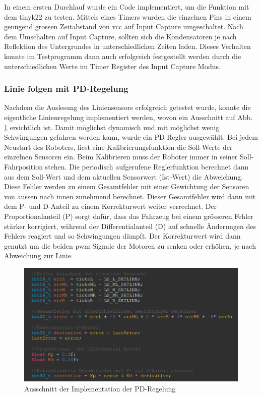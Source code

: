 In einem ersten Durchlauf wurde ein Code implementiert, um die Funktion mit dem \gls{tinyk22} zu testen. Mittels eines Timers wurden die einzelnen Pins in einem genügend grossen Zeitabstand von \acrfull{vcc} auf Input Capture umgeschaltet. Nach dem Umschalten auf Input Capture, sollten sich die Kondensatoren je nach Reflektion des Untergrundes in unterschiedlichen Zeiten laden. Dieses Verhalten konnte im Testprogramm dann auch erfolgreich festgestellt werden durch die unterschiedlichen Werte im Timer Register des Input Capture Modus.


\subsubsection{Linie folgen mit PD-Regelung}
\label{Linie folgen mit PD-Regelung}

Nachdem die Auslesung des Liniensensors erfolgreich getestet wurde, konnte die eigentliche Linienregelung implementiert werden, wovon ein Ausschnitt auf Abb. \ref{fig:Ausschnitt der Implementation der PD-Regelung} ersichtlich ist. Damit möglichst dynamisch und mit möglichst wenig Schwingungen gefahren werden kann, wurde ein PD-Regler ausgewählt. Bei jedem Neustart des Roboters, liest eine Kalibrierungsfunktion die Soll-Werte der einzelnen Sensoren ein. Beim Kalibrieren muss der Roboter immer in seiner Soll-Fahrposition stehen. Die periodisch aufgerufene Reglerfunktion berechnet dann aus dem Soll-Wert und dem aktuellen Sensorwert (Ist-Wert) die Abweichung. Diese Fehler werden zu einem Gesamtfehler mit einer Gewichtung der Sensoren von aussen nach innen zunehmend berechnet. Dieser Gesamtfehler wird dann mit dem P- und D-Anteil zu einem Korrekturwert weiter verrechnet. Der Proportionalanteil (P) sorgt dafür, dass das Fahrzeug bei einem grösseren Fehler stärker korrigiert, während der Differentialanteil (D) auf schnelle Änderungen des Fehlers reagiert und so Schwingungen dämpft. Der Korrekturwert wird dann genutzt um die beiden \acrfull{pwm} Signale der Motoren zu senken oder erhöhen, je nach Abweichung zur Linie.

 \begin{figure}[H]
\centering
\includegraphics[width= \textwidth ]{assets/ET/PD-Regler/PD-Regler_Code_Pren2.png}
\caption{Ausschnitt der Implementation der PD-Regelung}
\label{fig:Ausschnitt der Implementation der PD-Regelung}
\end{figure}


